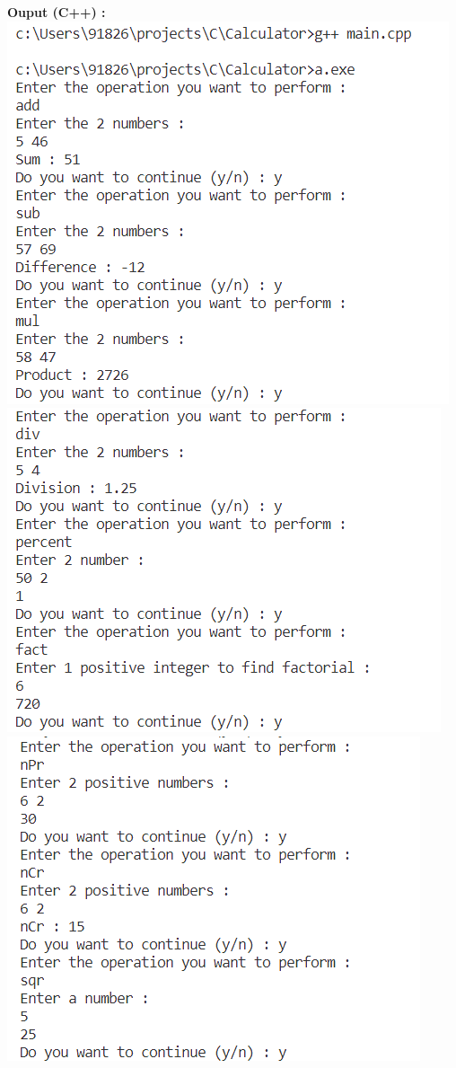 \documentclass{article}
\begin{document}
\textbf{\bf Ouput (C++) : \\}
\includegraphics[scale=0.70]{cpp_out_01}\\
\includegraphics[scale=0.70]{cpp_out_02}\\
\includegraphics[scale=0.70]{cpp_out_03}\\
\end{document}
